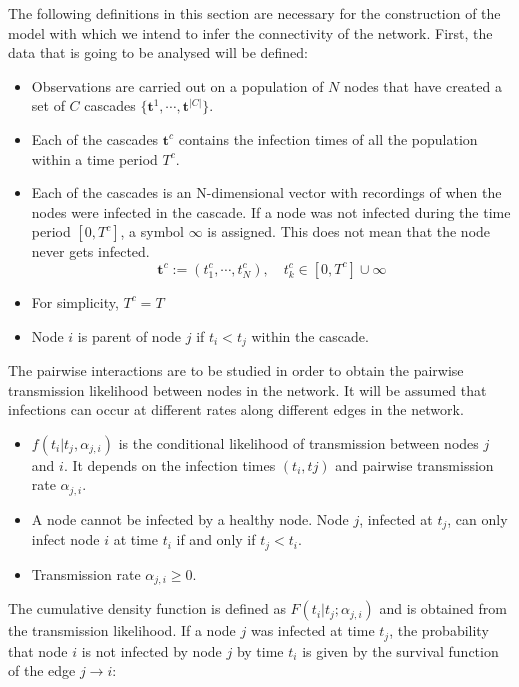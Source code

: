\documentclass[11pt]{article}
\begin{document}
The following definitions in this section are necessary for the construction of the model with which we intend to infer the connectivity of the network. First, the data that is going to be analysed will be defined:

\begin{itemize}
\item Observations are carried out on a population of $N$ nodes that have created a set of $C$ cascades $\{\textbf{t}^{1},\cdots,\textbf{t}^{|C|}\}$. 
\item Each of the cascades $\textbf{t}^{c}$ contains the infection times of all the population within a time period $T^{c}$.
\item Each of the cascades is an N-dimensional vector with recordings of when the nodes were infected in the cascade. If a node was not infected during the time period $[0,T^{c}]$, a symbol $\infty$ is assigned. This does not mean that the node never gets infected.
\begin{equation}\label{eq:data_netrate}
\textbf{t}^{c}:=(t_{1}^{c},\cdots,t_{N}^{c}),\quad t_{k}^{c}\in [0,T^{c}]\cup{\infty}
\end{equation}
\item For simplicity, $T^{c}=T$
\item Node $i$ is parent of node $j$ if $t_{i}<t_{j}$ within the cascade.
\end{itemize}

The pairwise interactions are to be studied in order to obtain the pairwise transmission likelihood between nodes in the network. It will be assumed that infections can occur at different rates along different edges in the network. 

\begin{itemize}
\item $f(t_{i}|t_{j},\alpha _{j,i})$ is the conditional likelihood of transmission between nodes $j$ and $i$. It depends on the infection times $(t_{i},t{j})$ and pairwise transmission rate $\alpha_{j,i}$.
\item A node cannot be infected by a healthy node. Node $j$, infected at $t_{j}$, can only infect node $i$ at time $t_{i}$ if and only if $t_{j}<t_{i}$.
\item Transmission rate $\alpha _{j,i}\geq0$.
\end{itemize}

The cumulative density function is defined as $F(t_{i}|t_{j};\alpha _{j,i})$ and is obtained from the transmission likelihood. If a node $j$ was infected at time $t_{j}$, the probability that node $i$ is not infected by node $j$ by time $t_{i}$ is given by the survival function of the edge $j\rightarrow i$:
\end{document}
